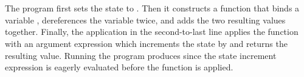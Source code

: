 \begin{code}
\AgdaSpace{}%
\AgdaSpace{}%
\AgdaSpace{}%
\<%
\\
%
\>[8]\AgdaSpace{}%
\AgdaSymbol{(}\AgdaSpace{}%
\AgdaSymbol{)}\<%
\\
%
\>[8]\AgdaSpace{}%
\AgdaSpace{}%
\AgdaSymbol{=}\AgdaSpace{}%
\AgdaSpace{}%
\AgdaSpace{}%
\AgdaSpace{}%
\AgdaSpace{}%
\AgdaSymbol{;}\AgdaSpace{}%
\AgdaSpace{}%
\AgdaSpace{}%
\AgdaSymbol{(}\AgdaSpace{}%
\AgdaOperator{\AgdaPrimitive{+}}\AgdaSpace{}%
\AgdaSymbol{);}\AgdaSpace{}%
\AgdaSpace{}%
\AgdaSpace{}%
\AgdaSpace{}%
\AgdaSymbol{;}\AgdaSpace{}%
\AgdaSpace{}%
\AgdaSymbol{(}\AgdaSpace{}%
\AgdaSymbol{)}\<%
\end{code}
The program first sets the state to .
Then it constructs a function that binds a variable , dereferences the variable twice, and adds the two resulting values together.
Finally, the application in the second-to-last line applies the function with an argument expression which increments the state by  and returns the resulting value.
Running the program produces  since the state increment expression is eagerly evaluated before the function is applied.
%
